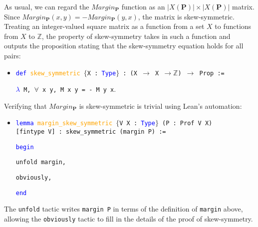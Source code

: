 \documentclass[runningheads]{llncs}
\begin{document}
As usual, we can regard the $Margin_\mathbf{P}$ function as an $|X(\mathbf{P})|\times |X(\mathbf{P})|$ matrix. Since $Margin_\mathbf{P}(x,y)=-Margin_\mathbf{P}(y,x)$, the matrix is skew-symmetric. Treating an integer-valued square matrix as a function from a set $X$ to functions from $X$ to $\mathbb{Z}$, the property of skew-symmetry takes in such a function and outputs the proposition stating that the skew-symmetry equation holds for all pairs:
\begin{itemize}
\item[] \texttt{\textcolor{blue}{def} \textcolor{orange}{skew\_symmetric} $\{$X : \textcolor{blue}{Type}$\}$ : (X $\to$ X $\to \mathbb{Z}$) $\to$ Prop :=} 

\texttt{\textcolor{blue}{$\lambda$} M, $\forall$ x y, M x y = - M y x}.
\end{itemize}
Verifying that $Margin_\mathbf{P}$ is skew-symmetric is trivial using Lean's automation:
\begin{itemize}
\item[] \texttt{\textcolor{blue}{lemma} \textcolor{orange}{margin\_skew\_symmetric} $\{$V X : \textcolor{blue}{Type}$\}$ (P : Prof V X)}\\ \texttt{[fintype V] : skew\_symmetric (margin P) :=} 
 
\texttt{\textcolor{blue}{begin}}



\quad \texttt{unfold margin,}

\quad \texttt{obviously,}


\texttt{\textcolor{blue}{end}}
\end{itemize}
The \texttt{unfold} tactic writes \texttt{margin P} in terms of the definition of \texttt{margin} above, allowing the \texttt{obviously} tactic to fill in the details of the proof of skew-symmetry.

\begin{comment}
As the logical form of the skew-symmetric proposition is \texttt{$\forall$ x y, Margin~P~x~y = - Margin P y x}, we prove the claim by two applications of universal introduction using the \texttt{intro} tactic. For arbitrary \texttt{x} and \texttt{y} in \texttt{X}, we must prove \texttt{Margin~P~x~y = - Margin P y x}. This is done by first unfolding the definition of \texttt{margin}, so that our goal is now to prove  
\begin{eqnarray*}
&&\mbox{\texttt{$\uparrow$(finset.univ.filter (\textcolor{blue}{$\lambda$} v, P v x y)).card -}} \\ 
  &&      \mbox{\texttt{$\uparrow$(finset.univ.filter (\textcolor{blue}{$\lambda$} v, P v y x)).card}}\\
  &\texttt{=}& \mbox{\texttt{-($\uparrow$(finset.univ.filter (\textcolor{blue}{$\lambda$} v, P v y x)).card -}} \\ 
    &&      \mbox{\texttt{$\uparrow$(finset.univ.filter (\textcolor{blue}{$\lambda$} v, P v x y)).card)}}
\end{eqnarray*}
Fortunately, Lean can prove this automatically using the \texttt{obviously} tactic.
\end{comment}
\end{document}
